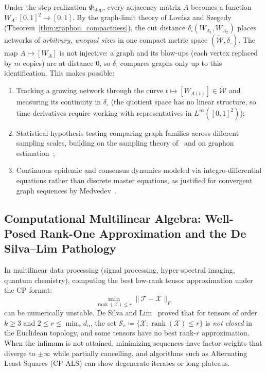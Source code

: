 \documentclass[11pt,a4paper,reqno]{amsart}
\theoremstyle{definition}
\numberwithin{equation}{section}
\newcommand{\rank}{\operatorname{rank}}
\begin{document}
Under the step realization $\Phi_{\mathrm{step}}$, every adjacency matrix $A$ becomes a function $W_A \colon [0, 1]^2 \to [0, 1]$. By the graph-limit theory of Lov\'asz and Szegedy (Theorem~\ref{thm:graphon_compactness}), the cut distance $\delta_\square(W_{A_1}, W_{A_2})$ places networks of \emph{arbitrary, unequal sizes} in one compact metric space $(\widetilde{\mathcal{W}}, \delta_\square)$. The map $A \mapsto [W_A]$ is not injective: a graph and its blow-ups (each vertex replaced by $m$ copies) are at distance $0$, so $\delta_\square$ compares graphs only up to this identification. This makes possible:
\begin{enumerate}[label=(\roman*)]
    \item Tracking a growing network through the curve $t \mapsto [W_{A(t)}] \in \widetilde{\mathcal{W}}$ and measuring its continuity in $\delta_\square$ (the quotient space has no linear structure, so time derivatives require working with representatives in $L^\infty([0,1]^2)$);
    \item Statistical hypothesis testing comparing graph families across different sampling scales, building on the sampling theory of~\cite{borgs2008convergent} and on graphon estimation~\cite{gao2015rate};
    \item Continuous epidemic and consensus dynamics modeled via integro-differential equations rather than discrete master equations, as justified for convergent graph sequences by Medvedev~\cite{medvedev2014nonlinear}.
\end{enumerate}

\subsection{Computational Multilinear Algebra: Well-Posed Rank-One Approximation and the De Silva--Lim Pathology}
\label{subsec:imp_tensors}
In multilinear data processing (signal processing, hyper-spectral imaging, quantum chemistry), computing the best low-rank tensor approximation under the CP format:
\begin{equation}
    \min_{\rank(\mathcal{X}) \le r} \|\mathcal{T} - \mathcal{X}\|_F
\end{equation}
can be numerically unstable. De Silva and Lim~\cite{desilva2008illposed} proved that for tensors of order $k \ge 3$ and $2 \le r \le \min_\alpha d_\alpha$, the set $\mathcal{S}_r \coloneqq \{\mathcal{X} \colon \rank(\mathcal{X}) \le r\}$ is \emph{not closed} in the Euclidean topology, and some tensors have no best rank-$r$ approximation. When the infimum is not attained, minimizing sequences have factor weights that diverge to $\pm\infty$ while partially cancelling, and algorithms such as Alternating Least Squares (CP-ALS) can show degenerate iterates or long plateaus.
\end{document}
